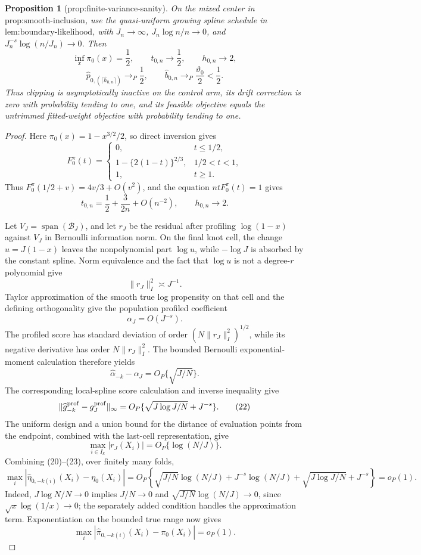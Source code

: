 \documentclass{article}
\newtheorem{proposition}{Proposition}
\begin{document}
\begin{proposition}[prop:finite-variance-sanity]\label{prop:finite-variance-sanity}
On the mixed center in \(\text{prop:smooth-inclusion}\), use the quasi-uniform growing spline schedule in \(\text{lem:boundary-likelihood}\), with \(J_n\to\infty\), \(J_n\log n/n\to0\), and \(J_n^{-s}\log(n/J_n)\to0\).  Then
\[
\inf_x\pi_0(x)=\frac12,\qquad t_{0,n}\to\frac12,\qquad h_{0,n}\to2,
\]
\[
\widehat p_{0,(\lceil\widehat h_{0,n}\rceil)}\to_P\frac12,\qquad
\widehat b_{0,n}\to_P\frac{\vartheta_0}2<\frac12.
\]
Thus clipping is asymptotically inactive on the control arm, its drift correction is zero with probability tending to one, and its feasible objective equals the untrimmed fitted-weight objective with probability tending to one.
\end{proposition}
\begin{proof}
Here \(\pi_0(x)=1-x^{3/2}/2\), so direct inversion gives
\[
F_0^\pi(t)=
\begin{cases}
0,&t\le1/2,\\
1-\{2(1-t)\}^{2/3},&1/2<t<1,\\
1,&t\ge1.
\end{cases}
\tag{17}
\]
Thus \(F_0^\pi(1/2+v)=4v/3+O(v^2)\), and the equation
\(ntF_0^\pi(t)=1\) gives
\[
t_{0,n}=\frac12+\frac{3}{2n}+O(n^{-2}),\qquad h_{0,n}\to2.
\tag{18}
\]

Let \(V_J=\operatorname{span}(\mathcal B_J)\), and let \(r_J\) be the residual after profiling \(\log(1-x)\) against \(V_J\) in Bernoulli information norm.  On the final knot cell, the change \(u=J(1-x)\) leaves the nonpolynomial part \(\log u\), while \(-\log J\) is absorbed by the constant spline.  Norm equivalence and the fact that \(\log u\) is not a degree-\(r\) polynomial give
\[
\|r_J\|_I^2\asymp J^{-1}.
\tag{19}
\]
Taylor approximation of the smooth true log propensity on that cell and the defining orthogonality give the population profiled coefficient
\[
\alpha_J=O(J^{-s}).
\tag{20}
\]
The profiled score has standard deviation of order \((N\|r_J\|_I^2)^{1/2}\), while its negative derivative has order \(N\|r_J\|_I^2\).  The bounded Bernoulli exponential-moment calculation therefore yields
\[
\widehat\alpha_{-k}-\alpha_J=O_P\{\sqrt{J/N}\}.
\tag{21}
\]
The corresponding local-spline score calculation and inverse inequality give
\[
\|\widehat g_{-k}^{\rm prof}-g_J^{\rm prof}\|_\infty
=O_P\{\sqrt{J\log J/N}+J^{-s}\}.
\tag{22}
\]
The uniform design and a union bound for the distance of evaluation points from the endpoint, combined with the last-cell representation, give
\[
\max_{i\in I_k}|r_J(X_i)|=O_P\{\log(N/J)\}.
\tag{23}
\]
Combining (20)--(23), over finitely many folds,
\[
\max_i|\widehat\eta_{0,-k(i)}(X_i)-\eta_0(X_i)|
=O_P\!\left\{\sqrt{J/N}\log(N/J)+J^{-s}\log(N/J)
+\sqrt{J\log J/N}+J^{-s}\right\}=o_P(1).
\tag{24}
\]
Indeed, \(J\log N/N\to0\) implies \(J/N\to0\) and
\(\sqrt{J/N}\log(N/J)\to0\), since \(\sqrt x\log(1/x)\to0\); the separately added condition handles the approximation term.  Exponentiation on the bounded true range now gives
\[
\max_i|\widehat\pi_{0,-k(i)}(X_i)-\pi_0(X_i)|=o_P(1).
\tag{25}
\]


\end{proof}
\end{document}
